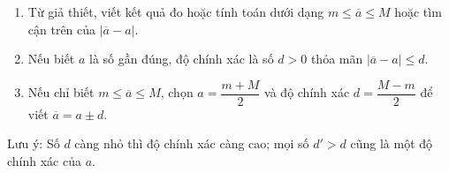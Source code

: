 \begin{enumerate}
\item Từ giả thiết, viết kết quả đo hoặc tính toán dưới dạng $m \le \overline{a} \le M$ hoặc tìm cận trên của $|\overline{a} - a|$.
\item Nếu biết $a$ là số gần đúng, độ chính xác là số $d > 0$ thỏa mãn $|\overline{a} - a| \le d$.
\item Nếu chỉ biết $m \le \overline{a} \le M$, chọn $a = \dfrac{m+M}{2}$ và độ chính xác $d = \dfrac{M-m}{2}$ để viết $\overline{a} = a \pm d$.
\end{enumerate}
Lưu ý: Số $d$ càng nhỏ thì độ chính xác càng cao; mọi số $d' > d$ cũng là một độ chính xác của $a$.
